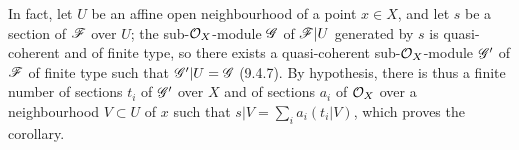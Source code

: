 \documentclass[../main.tex]{subfiles}
\begin{document}
In fact, let $U$ be an affine open neighbourhood of a point $x\in X$, and let $s$ be a section of $\mathscr{F}$ over $U$; the sub-$\mathcal{O}_X$-module $\mathscr{G}$ of $\mathscr{F}|U$ generated by $s$ is quasi-coherent and of finite type, so there exists a quasi-coherent sub-$\mathcal{O}_X$-module $\mathscr{G}'$ of $\mathscr{F}$ of finite type such that $\mathscr{G}'|U=\mathscr{G}$ (9.4.7).
By hypothesis, there is thus a finite number of sections $t_i$ of $\mathscr{G}'$ over $X$ and of sections $a_i$ of $\mathcal{O}_X$ over a neighbourhood $V\subset U$ of $x$ such that $s|V=\sum_i a_i(t_i|V)$, which proves the corollary.
\end{document}
